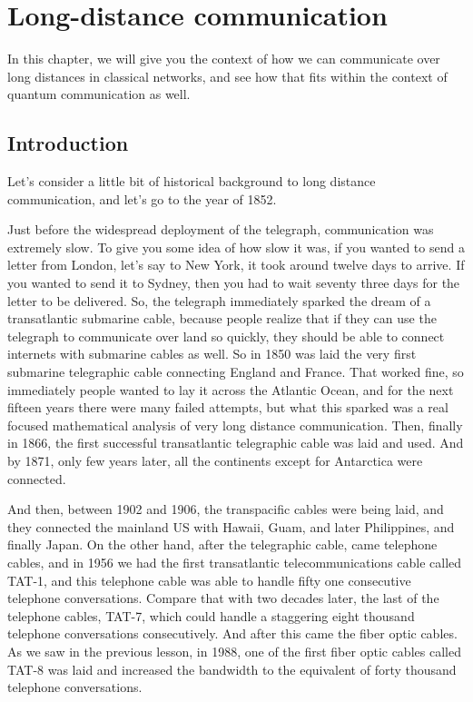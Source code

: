 \chapter{Long-distance communication}
\label{sec:11_long-distance}

In this chapter, we will give you the context of how we can communicate over long distances in classical networks, and see how that fits within the context of quantum communication as well.

\section{Introduction}


Let's consider a little bit of historical background to long distance communication, and let's go to the year of 1852.

Just before the widespread deployment of the telegraph, communication was extremely slow. To give you some idea of how slow it was, if you wanted to send a letter from London, let's say to New York, it took around twelve days to arrive. If you wanted to send it to Sydney, then you had to wait seventy three days for the letter to be delivered. So, the telegraph immediately sparked the dream of a transatlantic submarine cable, because people realize that if they can use the telegraph to communicate over land so quickly, they should be able to connect internets with submarine cables as well. So in 1850 was laid the very first submarine telegraphic cable connecting England and France. That worked fine, so immediately people wanted to lay it across the Atlantic Ocean, and for the next fifteen years there were many failed attempts, but what this sparked was a real focused mathematical analysis of very long distance communication. Then, finally in 1866, the first successful transatlantic telegraphic cable was laid and used. And by 1871, only few years later, all the continents except for Antarctica were connected.

And then, between 1902 and 1906, the transpacific cables were being laid, and they connected the mainland US with Hawaii, Guam, and later Philippines, and finally Japan. On the other hand, after the telegraphic cable, came telephone cables, and in 1956 we had the first transatlantic telecommunications cable called TAT-1, and this telephone cable was able to handle fifty one consecutive telephone conversations. Compare that with two decades later, the last of the telephone cables, TAT-7, which could handle a staggering eight thousand telephone conversations consecutively. And after this came the fiber optic cables. As we saw in the previous lesson, in 1988, one of the first fiber optic cables called TAT-8 was laid and increased the bandwidth to the equivalent of forty thousand telephone conversations.

